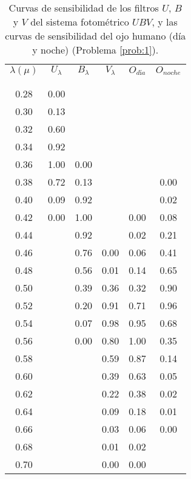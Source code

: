 \documentclass[12pt,spanish,a4paper]{practice}
\begin{document}
\begin{enumerate}[wide, labelwidth=!, labelindent=0pt, label=\textbf{\textrm{\arabic*)}}, ref=\arabic*]
      \begin{table}[h!]
        \centering
        \begin{tabular}{ c | c | c | c | c | c }
          $\lambda(\mu)$  & $U_\lambda$  & $B_\lambda$  & $V_\lambda$  & $O_{\textit{d\'ia}}$  & $O_{noche}$ \\
            &  &  &  &  &  \\[-0.8em]\hline
            &  &  &  &  &  \\[-0.8em]
          0.28  & 0.00  &  &  &  &  \\
          0.30  & 0.13  &  &  &  &  \\
          0.32  & 0.60  &  &  &  &  \\
          0.34  & 0.92  &  &  &  &  \\
          0.36  & 1.00  & 0.00  &  &  &  \\
          0.38  & 0.72  & 0.13  &  &  & 0.00 \\
          0.40  & 0.09  & 0.92  &  &  & 0.02 \\
          0.42  & 0.00  & 1.00  &  & 0.00  & 0.08 \\
          0.44  &  & 0.92  &  & 0.02  & 0.21 \\
          0.46  &  & 0.76  & 0.00  & 0.06  & 0.41 \\
          0.48  &  & 0.56  & 0.01  & 0.14  & 0.65 \\
          0.50  &  & 0.39  & 0.36  & 0.32  & 0.90 \\
          0.52  &  & 0.20  & 0.91  & 0.71  & 0.96 \\
          0.54  &  & 0.07  & 0.98  & 0.95  & 0.68 \\
          0.56  &  & 0.00  & 0.80  & 1.00  & 0.35 \\
          0.58  &  &  & 0.59  & 0.87  & 0.14 \\
          0.60  &  &  & 0.39  & 0.63  & 0.05 \\
          0.62  &  &  & 0.22  & 0.38  & 0.02 \\
          0.64  &  &  & 0.09  & 0.18  & 0.01 \\
          0.66  &  &  & 0.03  & 0.06  & 0.00 \\
          0.68  &  &  & 0.01  & 0.02  &  \\
          0.70  &  &  & 0.00  & 0.00  &  \\
          \hline
        \end{tabular}
        \caption{
          Curvas de sensibilidad de los filtros $U$, $B$ y $V$ del sistema fotométrico $UBV$, y las curvas de sensibilidad del ojo humano (día y noche) (Problema \ref{prob:1}).
        }
      \end{table}


\end{enumerate}
\end{document}
